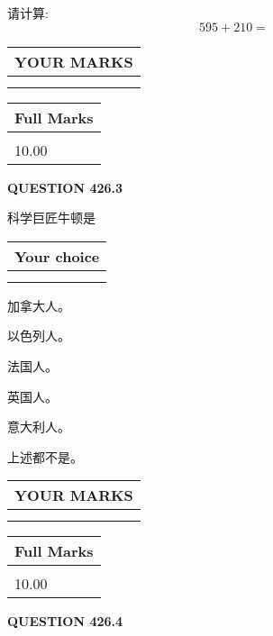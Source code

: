 \documentclass{ctexart}
\begin{document}
  
 
请计算:
\begin{equation}
595 +  %
210 = \nonumber
\end{equation}
 

 

 
  
\vspace{0.2in}
  
\noindent\begin{tabular}{|l|}
\hline
 YOUR MARKS  \\
\hline
 \\ 
 \\ 
\hline
\end{tabular}
\hspace{0.05in} \begin{tabular}{|l|}
\hline
 Full Marks  \\
\hline
 \\ 
10.00 \\
\hline
\end{tabular}
{\textbf{\Large{QUESTION
426.3 
}}}
  
  
科学巨匠牛顿是
  
  
\noindent\hspace{3.0in} \begin{tabular}{|l|}
\hline
Your choice \\
\hline
 \\ 
 \\ 
\hline
\end{tabular}
  
  
 
 
加拿大人。
 
 
以色列人。
 
 
法国人。
 
 
英国人。
 
 
意大利人。
 
 
 上述都不是。
 
 
  
\vspace{0.2in}
  
\noindent\begin{tabular}{|l|}
\hline
 YOUR MARKS  \\
\hline
 \\ 
 \\ 
\hline
\end{tabular}
\hspace{0.05in} \begin{tabular}{|l|}
\hline
 Full Marks  \\
\hline
 \\ 
10.00 \\
\hline
\end{tabular}
{\textbf{\Large{QUESTION
426.4 
}}}
  
\end{document}
